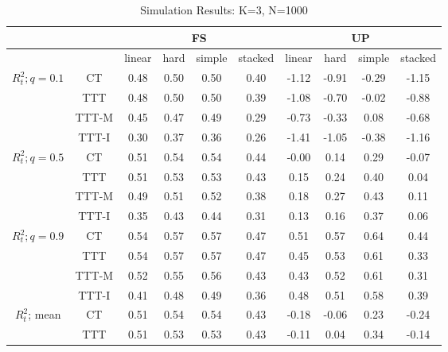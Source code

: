 \documentclass[a4paper,12pt]{article}
\theoremstyle{proposition}
\begin{document}
\begin{appendices}
\begin{table}
\label{tab:results-3}
\caption{Simulation Results: K=3, N=1000}
\begin{center}
\begin{tabular}{|c|c||c|c|c|c||c|c|c|c|}
\hline
    &  & \multicolumn{4}{|c||}{FS} &  \multicolumn{4}{|c|}{UP} \\
\hline
  &   & linear & hard & simple & stacked & linear & hard & simple & stacked \\
\hline
\hline
\multirow{4}{6em}{$R^2_{t}; q=0.1$}      &    CT &   0.48 &    0.50 &      0.50 &       0.40 &  -1.12 &   -0.91 &     -0.29 &      -1.15  \\
      &   TTT &   0.48 &    0.50 &      0.50 &       0.39 &  -1.08 &   -0.70 &     -0.02 &      -0.88  \\
      & TTT-M &   0.45 &    0.47 &      0.49 &       0.29 &  -0.73 &   -0.33 &      0.08 &      -0.68  \\
      & TTT-I &   0.30 &    0.37 &      0.36 &       0.26 &  -1.41 &   -1.05 &     -0.38 &      -1.16  \\
\hline
\hline
\multirow{4}{6em}{$R^2_{t}; q=0.5$}      &    CT &   0.51 &    0.54 &      0.54 &       0.44 &  -0.00 &    0.14 &      0.29 &      -0.07  \\
      &   TTT &   0.51 &    0.53 &      0.53 &       0.43 &   0.15 &    0.24 &      0.40 &       0.04  \\
      & TTT-M &   0.49 &    0.51 &      0.52 &       0.38 &   0.18 &    0.27 &      0.43 &       0.11  \\
      & TTT-I &   0.35 &    0.43 &      0.44 &       0.31 &   0.13 &    0.16 &      0.37 &       0.06  \\
\hline
\hline
\multirow{4}{6em}{$R^2_{t}; q=0.9$}      &    CT &   0.54 &    0.57 &      0.57 &       0.47 &   0.51 &    0.57 &      0.64 &       0.44  \\
      &   TTT &   0.54 &    0.57 &      0.57 &       0.47 &   0.45 &    0.53 &      0.61 &       0.33  \\
      & TTT-M &   0.52 &    0.55 &      0.56 &       0.43 &   0.43 &    0.52 &      0.61 &       0.31  \\
      & TTT-I &   0.41 &    0.48 &      0.49 &       0.36 &   0.48 &    0.51 &      0.58 &       0.39  \\
\hline
\hline
\multirow{4}{6em}{$R^2_{t}$; mean}     &    CT &   0.51 &    0.54 &      0.54 &       0.43 &  -0.18 &   -0.06 &      0.23 &      -0.24  \\
     &   TTT &   0.51 &    0.53 &      0.53 &       0.43 &  -0.11 &    0.04 &      0.34 &      -0.14  \\

\end{tabular}
\end{center}
\end{table}
\end{appendices}
\end{document}
